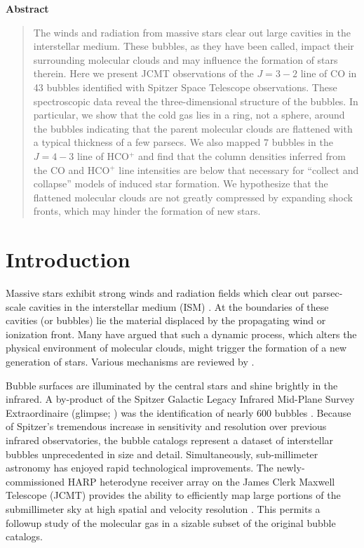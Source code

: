 \begin{center}
\bfseries Abstract
\end{center}
\begin{quote}

The winds and radiation from massive stars clear out large cavities in
the interstellar medium. These bubbles, as they have been called,
impact their surrounding molecular clouds and may influence the
formation of stars therein. Here we present JCMT observations of the
$J=3-2$ line of CO in 43 bubbles identified with Spitzer Space
Telescope observations. These spectroscopic data reveal the
three-dimensional structure of the bubbles.
In particular, we show that the cold gas lies in a
ring, not a sphere, around the
bubbles indicating that the parent molecular clouds
are flattened with a typical thickness of a few parsecs.
We also mapped 7 bubbles in the $J=4-3$ line of HCO$^+$
and find that the column densities inferred from the
CO and HCO$^+$ line intensities are below that necessary
for ``collect and collapse'' models of induced star formation. We hypothesize that
the flattened molecular clouds are not greatly compressed by expanding
shock fronts, which may hinder the formation of new stars.

\end{quote}

\section{Introduction}
\label{sec:intro}

Massive stars exhibit strong winds and radiation fields which clear
out parsec-scale cavities in the interstellar medium (ISM) \citep{Castor75, Weaver77}.
At the boundaries of these cavities (or bubbles) lie the
material displaced by the propagating wind or ionization front. Many
have argued that such a dynamic process, which alters the physical
environment of molecular clouds, might trigger the formation of a
new generation of stars. Various mechanisms are reviewed by .

Bubble surfaces are illuminated by the central stars and shine brightly
in the infrared. A by-product of the Spitzer Galactic Legacy Infrared
Mid-Plane Survey Extraordinaire ({\sc glimpse}; \citealt{Benjamin03})
was the identification of nearly 600 bubbles \citep{Churchwell06, Churchwell07}.
Because of Spitzer's tremendous increase in
sensitivity and resolution over previous infrared observatories, the
\glimpse bubble catalogs represent a dataset of interstellar
bubbles unprecedented in size and detail.  Simultaneously,
sub-millimeter astronomy has enjoyed rapid technological
improvements. The newly-commissioned HARP heterodyne receiver
array on the James Clerk Maxwell Telescope (JCMT) provides the
ability to efficiently map large portions of the submillimeter sky at high
spatial and velocity resolution \citep{Smith08}. This
permits a followup study of the molecular gas in a sizable
subset of the original bubble catalogs.

